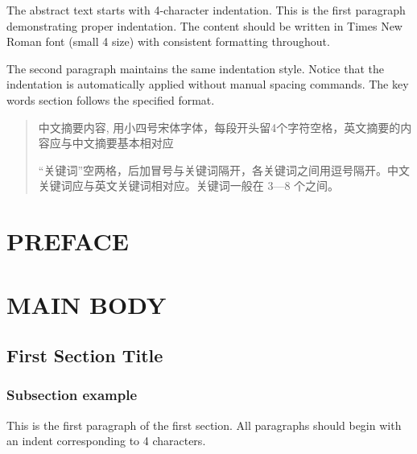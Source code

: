 \documentclass[UTF8,AutoFakeBold=1,AutoFakeSlant,zihao=-4]{SCNU}
\begin{document}
\coverpage

\begin{abstractEN}
\noindent\hspace*{4\ccwd}The abstract text starts with 4-character indentation. This is the first paragraph demonstrating proper indentation. The content should be written in Times New Roman font (small 4 size) with consistent formatting throughout.

The second paragraph maintains the same indentation style. Notice that the indentation is automatically applied without manual spacing commands. The key words section follows the specified format.

\end{abstractEN}

\begin{abstract}
\noindent\hspace*{4\ccwd}中文摘要内容, 用小四号宋体字体，每段开头留4个字符空格，英文摘要的内容应与中文摘要基本相对应

“关键词”空两格，后加冒号与关键词隔开，各关键词之间用逗号隔开。中文关键词应与英文关键词相对应。关键词一般在 3—8 个之间。

\end{abstract}

\contentpage
\section*{PREFACE}



\newpage

\section{MAIN BODY}
\subsection{First Section Title}
\subsubsection{Subsection example}
\vspace{1em}
\noindent\hspace*{4\ccwd}This is the first paragraph of the first section. All paragraphs should begin with an indent corresponding to 4 characters. 
\end{document}

